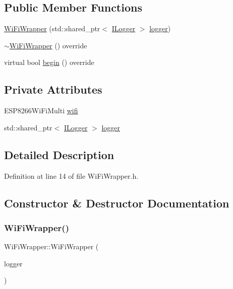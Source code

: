 \subsection*{Public Member Functions}
\begin{DoxyCompactItemize}
\item 
\hyperlink{class_wi_fi_wrapper_aec79496a912dc451d54ed04cb6c682d1}{Wi\+Fi\+Wrapper} (std\+::shared\+\_\+ptr$<$ \hyperlink{class_i_logger}{I\+Logger} $>$ \hyperlink{class_wi_fi_wrapper_aed67f566d96f9e0a9a668ec03bbb4764}{logger})
\item 
\hyperlink{class_wi_fi_wrapper_a4c6dbcd78612070abf2b9a7fa5efb92c}{$\sim$\+Wi\+Fi\+Wrapper} () override
\item 
virtual bool \hyperlink{class_wi_fi_wrapper_a6d2ace1968e0f9b04f690e66679dae0c}{begin} () override
\end{DoxyCompactItemize}
\subsection*{Private Attributes}
\begin{DoxyCompactItemize}
\item 
E\+S\+P8266\+Wi\+Fi\+Multi \hyperlink{class_wi_fi_wrapper_afcf4e83ce32f98305ef5616fc0df499b}{wifi}
\item 
std\+::shared\+\_\+ptr$<$ \hyperlink{class_i_logger}{I\+Logger} $>$ \hyperlink{class_wi_fi_wrapper_aed67f566d96f9e0a9a668ec03bbb4764}{logger}
\end{DoxyCompactItemize}


\subsection{Detailed Description}


Definition at line 14 of file Wi\+Fi\+Wrapper.\+h.



\subsection{Constructor \& Destructor Documentation}
\mbox{\label{class_wi_fi_wrapper_aec79496a912dc451d54ed04cb6c682d1}} 
\subsubsection{\texorpdfstring{Wi\+Fi\+Wrapper()}{WiFiWrapper()}}
{\footnotesize\ttfamily Wi\+Fi\+Wrapper\+::\+Wi\+Fi\+Wrapper (\begin{DoxyParamCaption}\item[{std\+::shared\+\_\+ptr$<$ \hyperlink{class_i_logger}{I\+Logger} $>$}]{logger }\end{DoxyParamCaption})}



